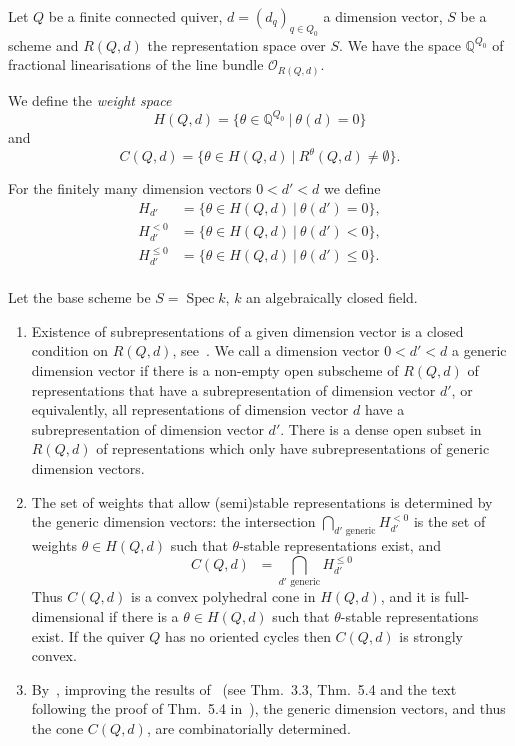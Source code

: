 \documentclass[ALCO,ThmDefs,Unicode,epreuves]{cedram}
\def\Q{\mathds Q}
\def\O{\mathcal O}
\DeclareMathOperator{\Spec}{Spec}
\begin{document}

Let $Q$ be a finite connected quiver, $d=(d_q)_{q\in Q_0}$ a dimension vector, 
$S$ be a scheme and $R(Q,d)$ the representation space over $S$. We have the space 
$\Q^{Q_0}$ of fractional linearisations of the line bundle $\O_{R(Q,d)}$. 

\begin{defi} We define the {\it weight space}
\[\textstyle
H(Q,d)=\big\{\theta\in\Q^{Q_0}\:|\:\theta(d)=0\big\}
\]
and
\[
C(Q,d)=\big\{\theta\in H(Q,d)\:|\:R^\theta(Q,d)\neq\emptyset\big\}.
\]
\end{defi}

For the finitely many dimension vectors $0<d'<d$ we define
\[
\begin{aligned}
H_{d'}&=\{\theta\in H(Q,d)\:|\:\theta(d')=0\},\\
H^{<0}_{d'}&=\{\theta\in H(Q,d)\:|\:\theta(d')<0\},\\
H^{\leq0}_{d'}&=\{\theta\in H(Q,d)\:|\:\theta(d')\leq0\}.\\
\end{aligned}
\]

\begin{rema}\label{rem:CQd}
Let the base scheme be $S=\Spec k$, $k$ an algebraically closed field.

\begin{enumerate}[label=(\arabic*)]
\item\label{rema1.12_1}
Existence of subrepresentations of a given dimension vector is a closed condition 
on $R(Q,d)$, see~\cite[Lemma~3.1]{Scho92}.
We call a dimension vector $0<d'<d$ a generic dimension vector if there is 
a non-empty open subscheme of $R(Q,d)$ of representations that have a 
subrepresentation of dimension vector $d'$, or equivalently, all representations
of dimension vector $d$ have a subrepresentation of dimension vector $d'$.
There is a dense open subset in $R(Q,d)$ of representations which only have
subrepresentations of generic dimension vectors. %

\item\label{rema1.12_2}
The set of weights that allow (semi)stable representations is determined by 
the generic dimension vectors:
the intersection $\bigcap_{\text{$d'\!\!$ generic}}H^{<0}_{d'}$ is the set of 
weights $\theta\in H(Q,d)$ such that $\theta$-stable representations exist, and
\[
C(Q,d)\;\;=\bigcap_{\text{$d'\!\!$ generic}}\!\!\!H^{\leq0}_{d'}
\] 
Thus $C(Q,d)$ is a convex polyhedral cone in $H(Q,d)$, and it is full-dimensional 
if there is a $\theta\in H(Q,d)$ such that $\theta$-stable representations exist.
If the quiver $Q$ has no oriented cycles then $C(Q,d)$ is strongly convex. %

\item\label{rema1.12_3}
By~\cite[Cor.~1]{Cr96}, improving the results of~\cite{Scho92} (see Thm.\ 3.3, 
Thm.\ 5.4 and the text following the proof of Thm.\ 5.4 in~\cite{Scho92}), the 
generic dimension vectors, and thus the cone $C(Q,d)$, are combinatorially determined. 
\end{enumerate}
\end{rema}
\end{document}
